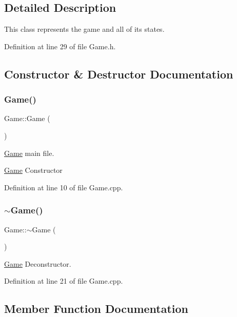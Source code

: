 \subsection{Detailed Description}
This class represents the game and all of its states. 

Definition at line 29 of file Game.\+h.



\subsection{Constructor \& Destructor Documentation}
\mbox{\label{class_game_ad59df6562a58a614fda24622d3715b65}} 
\subsubsection{\texorpdfstring{Game()}{Game()}}
{\footnotesize\ttfamily Game\+::\+Game (\begin{DoxyParamCaption}{ }\end{DoxyParamCaption})}



\mbox{\hyperlink{class_game}{Game}} main file. 

\mbox{\hyperlink{class_game}{Game}} Constructor 

Definition at line 10 of file Game.\+cpp.

\mbox{\label{class_game_ae3d112ca6e0e55150d2fdbc704474530}} 
\subsubsection{\texorpdfstring{$\sim$Game()}{~Game()}}
{\footnotesize\ttfamily Game\+::$\sim$\+Game (\begin{DoxyParamCaption}{ }\end{DoxyParamCaption})}



\mbox{\hyperlink{class_game}{Game}} Deconstructor. 



Definition at line 21 of file Game.\+cpp.



\subsection{Member Function Documentation}
\mbox{\label{class_game_ad4f36a72a2d06696f7973788606f57fc}} 
